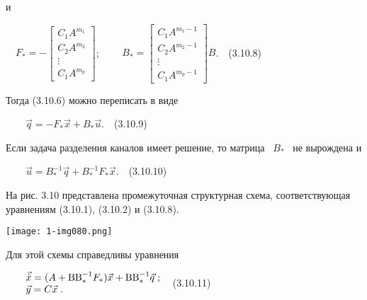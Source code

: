 \documentclass[a4paper]{article}
\newcommand\normalsubformula[1]{\text{\mathversion{normal}$#1$}}
\begin{document}
{\begin{russian}\sffamily
и
\end{russian}}

{\begin{russian}\sffamily
\ \  $F_{\ast }=-\left[\begin{matrix}C_1A^{m_1}\\C_2A^{m_2}\\\vdots \\C_1A^{m_p}\end{matrix}\right]$; \ \ \ \  $B_{\ast
}=\left[\begin{matrix}C_1A^{m_1-1}\\C_2A^{m_2-1}\\\vdots \\C_1A^{m_p-1}\end{matrix}\right]B$.\ \ (3.10.8)
\end{russian}}

{\begin{russian}\sffamily
Тогда (3.10.6) можно переписать в виде
\end{russian}}

{\begin{russian}\sffamily
\ \ \ \  $\vec q=-F_{\ast }\vec x+B_{\ast }\vec u$.\ \ (3.10.9)
\end{russian}}

{\begin{russian}\sffamily
Если задача разделения каналов имеет решение, то матрица \  $B_{\ast }$ \ не вырождена и
\end{russian}}

{\begin{russian}\sffamily
\ \ \ \  $\vec u=B_{\ast }^{-1}\vec q+B_{\ast }^{-1}F_{\ast }\vec x$.\ \ (3.10.10)
\end{russian}}

{\begin{russian}\sffamily
На рис. 3.10 представлена промежуточная структурная схема, соответствующая уравнениям (3.10.1), (3.10.2) и (3.10.8).
\end{russian}}

{\centering  \texttt{[image: 1-img080.png]} \par}

\bigskip

{\begin{russian}\sffamily
Для этой схемы справедливы уравнения
\end{russian}}

{\begin{russian}\sffamily
\ \ \ \  $\begin{matrix}\vec{\dot x}=(A+\normalsubformula{\text{BB}}_{\ast }^{-1}F_{\ast })\vec
x+\normalsubformula{\text{BB}}_{\ast }^{-1}\vec q\;;\hfill\null \\\vec y=C\vec x\;.\hfill\null \end{matrix}\hfill
$\ \ (3.10.11)
\end{russian}}
\end{document}
